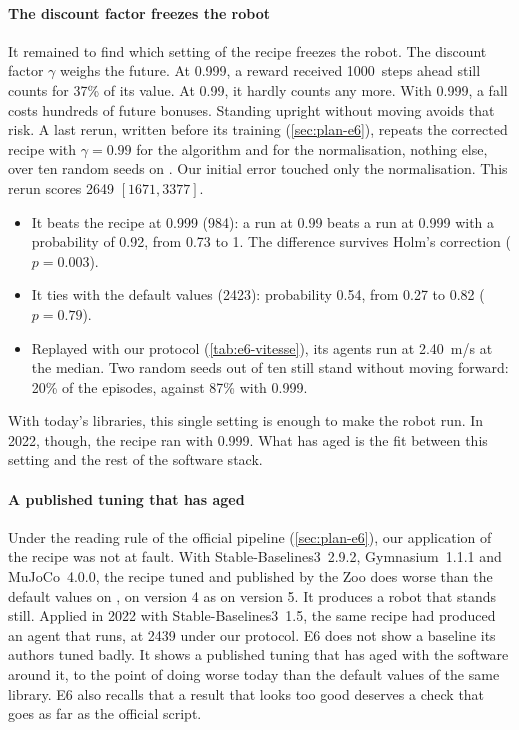 \paragraph{The discount factor freezes the robot}
It remained to find which setting of the recipe freezes the robot. The discount factor $\gamma$ weighs the
future. At 0.999, a reward received \num{1000}~steps ahead still counts for 37\% of its value. At 0.99, it
hardly counts any more. With 0.999, a fall costs hundreds of future bonuses. Standing upright without
moving avoids that risk. A last rerun, written before its training (\cref{sec:plan-e6}), repeats the
corrected recipe with $\gamma = 0.99$ for the algorithm and for the normalisation, nothing else, over ten
random seeds on . Our initial error touched only the normalisation. This rerun scores
\num{2649} $[\num{1671}, \num{3377}]$.
\begin{itemize}
  \item It beats the recipe at 0.999 (\num{984}): a run at 0.99 beats a run at 0.999 with a probability of
    0.92, from 0.73 to 1. The difference survives Holm's correction ($p=0.003$).
  \item It ties with the default values (\num{2423}): probability 0.54, from 0.27 to 0.82 ($p=0.79$).
  \item Replayed with our protocol (\cref{tab:e6-vitesse}), its agents run at 2.40~m/s at the median. Two
    random seeds out of ten still stand without moving forward: 20\% of the episodes, against 87\% with
    0.999.
\end{itemize}
With today's libraries, this single setting is enough to make the robot run. In 2022, though, the recipe ran
with 0.999. What has aged is the fit between this setting and the rest of the software stack.

\paragraph{A published tuning that has aged}
Under the reading rule of the official pipeline (\cref{sec:plan-e6}), our application of the recipe was not at fault. With
Stable-Baselines3~2.9.2, Gymnasium~1.1.1 and MuJoCo~4.0.0, the recipe tuned and published by the Zoo
does worse than the default values on , on version 4 as on version 5. It produces a robot that
stands still. Applied in 2022 with Stable-Baselines3~1.5, the same recipe had produced an agent that runs, at
\num{2439} under our protocol. E6 does not show a baseline its authors tuned badly. It shows a published tuning
that has aged with the software around it, to the point of doing worse today than the default values of the
same library. E6 also recalls that a result that looks too good deserves a check that goes as far as the
official script.

